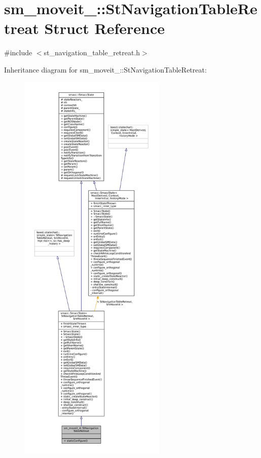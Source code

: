 \hypertarget{structsm__moveit__4_1_1StNavigationTableRetreat}{}\section{sm\+\_\+moveit\+\_\+:\+:St\+Navigation\+Table\+Retreat Struct Reference}
\label{structsm__moveit__4_1_1StNavigationTableRetreat}


{\ttfamily \#include $<$st\+\_\+navigation\+\_\+table\+\_\+retreat.\+h$>$}



Inheritance diagram for sm\+\_\+moveit\+\_\+:\+:St\+Navigation\+Table\+Retreat\+:
\nopagebreak
\begin{figure}[H]
\begin{center}
\leavevmode
\includegraphics[height=550pt]{structsm__moveit__4_1_1StNavigationTableRetreat__inherit__graph}
\end{center}
\end{figure}


